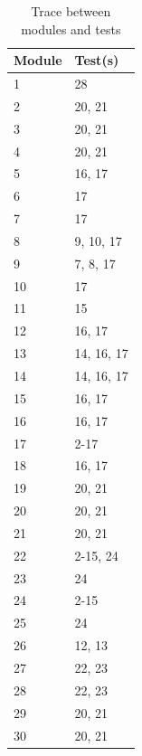 \documentclass[12pt, titlepage]{article}
\begin{document}
\begin{table}[ht]
\caption{Trace between modules and tests} \label{tab:tracemod}
\centering
\begin{tabularx}{0.55\textwidth}{p{5cm}X}
\toprule {\bf Module} & {\bf Test(s)}\\
\midrule
1	&	28	\\
2	&	20, 21	\\
3	&	20, 21	\\
4	&	20, 21	\\
5	&	16, 17	\\
6	&	17	\\
7	&	17	\\
8	&	9, 10, 17	\\
9	&	7, 8, 17\\
10	&	17	\\
11	&	15	\\
12	&	16, 17	\\
13	&	14, 16, 17	\\
14	&	14, 16, 17	\\
15	&	16, 17	\\
16	&	16, 17	\\
17	&	2-17	\\
18	&	16, 17	\\
19	&	20, 21	\\
20	&	20, 21	\\
21	&	20, 21	\\
22	&	2-15, 24	\\
23	&	24	\\
24	&	2-15	\\
25	&	24	\\
26	&	12, 13	\\
27	&	22, 23	\\
28  &    22, 23   \\
29  &    20, 21   \\
30 & 20, 21\\
\bottomrule
\end{tabularx}
\end{table}
\end{document}
